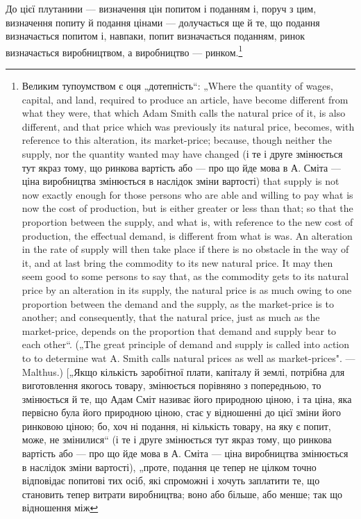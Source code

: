 До цієї плутанини — визначення цін попитом і поданням і,
поруч з цим, визначення попиту й подання цінами — долучається
ще й те, що подання визначається попитом і, навпаки,
попит визначається поданням, ринок визначається виробництвом,
а виробництво — ринком.\footnote{
Великим тупоумством є оця „дотепність“: „Where the quantity of wages,
capital, and land, required to produce an article, have become different from what
they were, that which Adam Smith calls the natural price of it, is also different,
and that price which was previously its natural price, becomes, with reference to
this alteration, its market-price; because, though neither the supply, nor the quantity
wanted may have changed (і те і друге змінюється тут якраз тому, що
ринкова вартість або — про що йде мова в А. Сміта — ціна виробництва змінюється
в наслідок зміни вартості) that supply is not now exactly enough for
those persons who are able and willing to pay what is now the cost of production,
but is either greater or less than that; so that the proportion between the supply,
and what is, with reference to the new cost of production, the effectual demand,
is different from what is was. An alteration in the rate of supply will then take
place if there is no obstacle іn the way of it, and at last bring the commodity
to its new natural price. It may then seem good to some persons to say that, as
the commodity gets to its natural price by an alteration in its supply, the natural
price is as much owing to one proportion between the demand and the supply, as
the market-price is to another; and consequently, that the natural price, just as
much as the market-price, depends on the proportion that demand and supply
bear to each other“. („The great principle of demand and supply is called into
action to to determine wat A. Smith calls natural prices as well as market-prices". —
Malthus.) [„Якщо кількість заробітної плати, капіталу й землі, потрібна для
виготовлення якогось товару, змінюється порівняно з попередньою, то змінюється
й те, що Адам Сміт називає його природною ціною, і та ціна, яка
первісно була його природною ціною, стає у відношенні до цієї зміни його
ринковою ціною; бо, хоч ні подання, ні кількість товару, на яку є попит,
може, не змінилися“ (і те і друге змінюється тут якраз тому, що ринкова
вартість або — про що йде мова в А. Сміта — ціна виробництва змінюється
в наслідок зміни вартості), „проте, подання це тепер не цілком точно відповідає
попитові тих осіб, які спроможні і хочуть заплатити те, що становить тепер
витрати виробництва; воно або більше, або менше; так що відношення між
}
